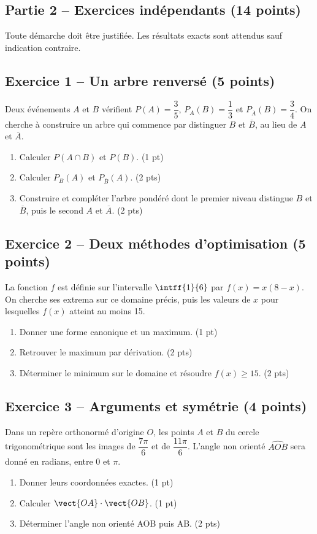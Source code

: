 \mxnewpage\subsection*{Partie 2 -- Exercices indépendants (14 points)}
Toute démarche doit être justifiée. Les résultats exacts sont attendus sauf indication contraire.
\subsection*{Exercice 1 -- Un arbre renversé (5 points)}
Deux événements $A$ et $B$ vérifient $P(A)=\dfrac35$, $P_A(B)=\dfrac13$ et $P_{\overline A}(B)=\dfrac34$. On cherche à construire un arbre qui commence par distinguer $B$ et $\overline B$, au lieu de $A$ et $\overline A$.
\begin{enumerate}
\item Calculer $P(A\cap B)$ et $P(B)$. \hfill(1 pt)
\item Calculer $P_B(A)$ et $P_{\overline B}(A)$. \hfill(2 pts)
\item Construire et compléter l’arbre pondéré dont le premier niveau distingue $B$ et $\overline B$, puis le second $A$ et $\overline A$. \hfill(2 pts)
\end{enumerate}
\subsection*{Exercice 2 -- Deux méthodes d’optimisation (5 points)}
La fonction $f$ est définie sur l’intervalle $\intff{1}{6}$ par $f(x)=x(8-x)$. On cherche ses extrema sur ce domaine précis, puis les valeurs de $x$ pour lesquelles $f(x)$ atteint au moins 15.
\begin{enumerate}
\item Donner une forme canonique et un maximum. \hfill(1 pt)
\item Retrouver le maximum par dérivation. \hfill(2 pts)
\item Déterminer le minimum sur le domaine et résoudre $f(x)\geq15$. \hfill(2 pts)
\end{enumerate}
\subsection*{Exercice 3 -- Arguments et symétrie (4 points)}
Dans un repère orthonormé d’origine $O$, les points $A$ et $B$ du cercle trigonométrique sont les images de $\dfrac{7\pi}6$ et de $\dfrac{11\pi}6$. L’angle non orienté $\widehat{AOB}$ sera donné en radians, entre 0 et $\pi$.
\begin{enumerate}
\item Donner leurs coordonnées exactes. \hfill(1 pt)
\item Calculer $\vect{OA}\cdot\vect{OB}$. \hfill(1 pt)
\item Déterminer l’angle non orienté AOB puis AB. \hfill(2 pts)
\end{enumerate}
